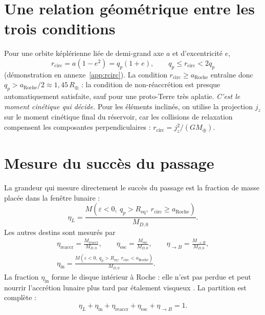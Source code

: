 \documentclass[11pt,a4paper,openany]{report}
\newcommand{\Mt}{M_{\oplus}}
\newcommand{\Rt}{R_{\oplus}}
\newcommand{\Req}{R_{\mathrm{eq}}}
\newcommand{\aR}{a_{\mathrm{Roche}}}
\begin{document}
\section{Une relation géométrique entre les trois conditions}

Pour une orbite képlérienne liée de demi-grand axe $a$ et d'excentricité $e$,
\begin{equation}
r_{\mathrm{circ}}=a(1-e^2)=q_p(1+e),\qquad q_p\le r_{\mathrm{circ}}<2q_p
\label{eq:rcirc-qp}
\end{equation}
(démonstration en annexe~\ref{app:rcirc}). La condition $r_{\mathrm{circ}}\ge\aR$ entraîne donc
$q_p>\aR/2\approx1{,}45\,\Rt$ : la condition de non-réaccrétion est presque automatiquement
satisfaite, sauf pour une proto-Terre très aplatie. \emph{C'est le moment cinétique qui décide.}
Pour les éléments inclinés, on utilise la projection $j_z$ sur le moment cinétique final du
réservoir, car les collisions de relaxation compensent les composantes perpendiculaires :
$r_{\mathrm{circ}}=j_z^2/(G\Mt)$.

\section{Mesure du succès du passage}

La grandeur qui mesure directement le succès du passage est la fraction de masse placée dans la
fenêtre lunaire :
\begin{equation}
\boxed{\;\eta_L=\frac{M\!\left(\varepsilon<0,\ q_p>\Req,\ r_{\mathrm{circ}}\ge\aR\right)}{M_{D,0}}.\;}
\label{eq:etaL}
\end{equation}
Les autres destins sont mesurés par
\begin{equation}
\begin{gathered}
\eta_{\mathrm{reaccr}}=\frac{M_{\mathrm{reaccr}}}{M_{D,0}},\qquad
\eta_{\mathrm{esc}}=\frac{M_{\mathrm{esc}}}{M_{D,0}},\qquad
\eta_{\to B}=\frac{M_{\to B}}{M_{D,0}},\\[4pt]
\eta_{\mathrm{in}}=\frac{M(\varepsilon<0,\ q_p>\Req,\ r_{\mathrm{circ}}<\aR)}{M_{D,0}}.
\end{gathered}
\label{eq:etas}
\end{equation}
La fraction $\eta_{\mathrm{in}}$ forme le disque intérieur à Roche : elle n'est pas perdue et peut
nourrir l'accrétion lunaire plus tard par étalement visqueux \cite{SalmonCanup2012}. La partition
est complète :
\begin{equation}
\boxed{\;\eta_L+\eta_{\mathrm{in}}+\eta_{\mathrm{reaccr}}+\eta_{\mathrm{esc}}+\eta_{\to B}=1.\;}
\label{eq:partition}
\end{equation}
\end{document}
